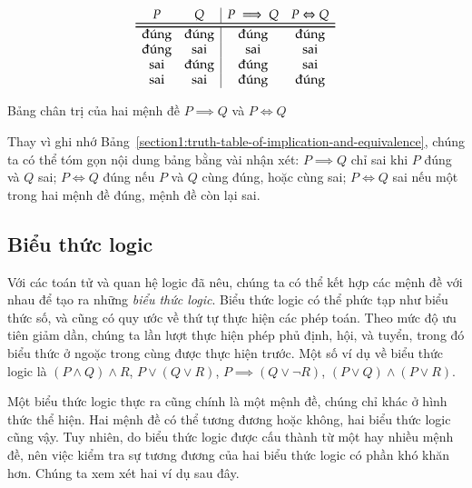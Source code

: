 \begin{table}[htp]
    \centering
    \[
        \begin{array}{cc|cc}
            P           & Q           & P\implies Q & P\Leftrightarrow Q \\
            \toprule
            \bottomrule
            \text{đúng} & \text{đúng} & \text{đúng} & \text{đúng}        \\
            \text{đúng} & \text{sai}  & \text{sai}  & \text{sai}         \\
            \text{sai}  & \text{đúng} & \text{đúng} & \text{sai}         \\
            \text{sai}  & \text{sai}  & \text{đúng} & \text{đúng}
        \end{array}
    \]
    \caption{Bảng chân trị của hai mệnh đề $P\implies Q$ và $P\Leftrightarrow Q$}\label{section1:truth-table-of-implication-and-equivalence}
\end{table}

Thay vì ghi nhớ Bảng~\ref{section1:truth-table-of-implication-and-equivalence}, chúng ta có thể tóm gọn nội dung bảng bằng vài nhận xét: $P\implies Q$ chỉ sai khi $P$ đúng và $Q$ sai; $P\Leftrightarrow Q$ đúng nếu $P$ và $Q$ cùng đúng, hoặc cùng sai; $P\Leftrightarrow Q$ sai nếu một trong hai mệnh đề đúng, mệnh đề còn lại sai.

\subsection{Biểu thức logic}

Với các toán tử và quan hệ logic đã nêu, chúng ta có thể kết hợp các mệnh đề với nhau để tạo ra những \textit{biểu thức logic}. Biểu thức logic có thể phức tạp như biểu thức số, và cũng có quy ước về thứ tự thực hiện các phép toán. Theo mức độ ưu tiên giảm dần, chúng ta lần lượt thực hiện phép phủ định, hội, và tuyển, trong đó biểu thức ở ngoặc trong cùng được thực hiện trước. Một số ví dụ về biểu thức logic là $(P\wedge Q)\wedge R$, $P\vee (Q\vee R)$, $P \implies (Q\vee \neg R)$, $(P\vee Q) \wedge (P\vee R)$.

Một biểu thức logic thực ra cũng chính là một mệnh đề, chúng chỉ khác ở hình thức thể hiện. Hai mệnh đề có thể tương đương hoặc không, hai biểu thức logic cũng vậy. Tuy nhiên, do biểu thức logic được cấu thành từ một hay nhiều mệnh đề, nên việc kiểm tra sự tương đương của hai biểu thức logic có phần khó khăn hơn. Chúng ta xem xét hai ví dụ sau đây.

